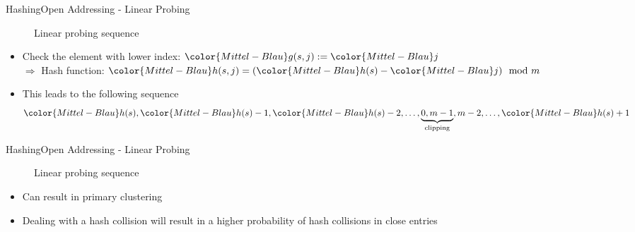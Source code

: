 
\begin{frame}{Hashing}{Open Addressing - Linear Probing}
  \begin{figure}[!h]
    \begin{adjustbox}{width=0.75\linewidth}%
    \end{adjustbox}
    \vspace{-1.0em}
    \caption{Linear probing sequence}%
    \label{fig:hashing:open_addressing:linear_probing}%
  \end{figure}
  \vspace{-1.0em}
  \begin{itemize}
    \item
      Check the element with lower index:
      \begin{math}
        {\color{Mittel-Blau}g(s,j)} := {\color{Mittel-Blau}j}
      \end{math}\\
      $\Rightarrow$ Hash function:
      \begin{math}
        {\color{Mittel-Blau}h(s,j)}
        = ({\color{Mittel-Blau}h(s)} - {\color{Mittel-Blau}j}) \mod m
      \end{math}
    \item
      This leads to the following sequence
      \begin{displaymath}
        {\color{Mittel-Blau}h(s)},
        {\color{Mittel-Blau}h(s)}-1,
        {\color{Mittel-Blau}h(s)}-2,
        \dots,
        \underbrace{0, m-1}_\text{clipping},
        m-2,
        \dots,
        {\color{Mittel-Blau}h(s)}+1
      \end{displaymath}
  \end{itemize}
\end{frame}


\begin{frame}{Hashing}{Open Addressing - Linear Probing}
  \begin{figure}[!h]
    \begin{adjustbox}{width=0.75\linewidth}%
    \end{adjustbox}
    \vspace{-0.5em}
    \caption{Linear probing sequence}%
    \label{fig:hashing:open_addressing:linear_probing2}%
  \end{figure}
  \vspace{-1.5em}
  \begin{itemize}
    \item
      Can result in primary clustering
    \item
      Dealing with a hash collision will result in a higher probability of hash
      collisions in close entries
  \end{itemize}
\end{frame}

